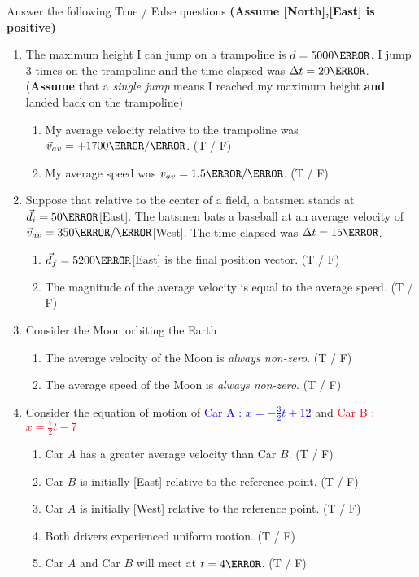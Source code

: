 \documentclass[12pt]{article} %
\begin{document}
\begin{qstn}[1]
	Answer the following True / False questions \textbf{(Assume [North],[East] is positive)}
	\begin{enumerate}
		\item The maximum height I can jump on a trampoline is $d = 5000\m$. I jump $3$ times on the trampoline and the time elapsed was $\Delta t = 20\s$. (\textbf{Assume} that a \emph{single jump} means I reached my maximum height \textbf{and} landed back on the trampoline)
			\begin{enumerate}[label = (\alph*)]
				\item My average velocity relative to the trampoline was $\vec v_{av} = +1700 \m / \s$. (T / F)
				\item My average speed was $v_{av} = 1.5 \km / \s$. (T / F)
			\end{enumerate}


		\item Suppose that relative to the center of a field, a batsmen stands at $\vec d_i = 50\m$[East]. The batsmen bats a baseball at an average velocity of $\vec v_{av} = 350 \m / \s$[West]. The time elapsed was $\Delta t = 15\s$.
			\begin{enumerate}[label = (\alph*)]
				\item $\vec d_f = 5200 \m$[East] is the final position vector. (T / F)
				\item The magnitude of the average velocity is equal to the average speed. (T / F)
			\end{enumerate}


		\item Consider the Moon orbiting the Earth
			\begin{enumerate}[label = (\alph*)]
				\item The average velocity of the Moon is \emph{always non-zero}. (T / F)
				\item The average speed of the Moon is \emph{always non-zero}. (T / F)
			\end{enumerate}
		
		
		\item Consider the equation of motion of \textcolor{blue}{Car A :} \textcolor{blue}{$x = -\frac{3}{2}t  + 12$} and \textcolor{red}{Car B :} \textcolor{red}{$x = \frac{7}{2}t - 7$}
			\begin{enumerate}[label = (\alph*)]
				\item Car $A$ has a greater average velocity than Car $B$. (T / F)
				\item Car $B$ is initially [East] relative to the reference point. (T / F)
				\item Car $A$ is initially [West] relative to the reference point. (T / F) 
				\item Both drivers experienced uniform motion. (T / F)
				\item Car $A$ and Car $B$ will meet at $t = 4\s$. (T / F)
			\end{enumerate}
		


\end{enumerate}
\end{qstn}
\end{document}
